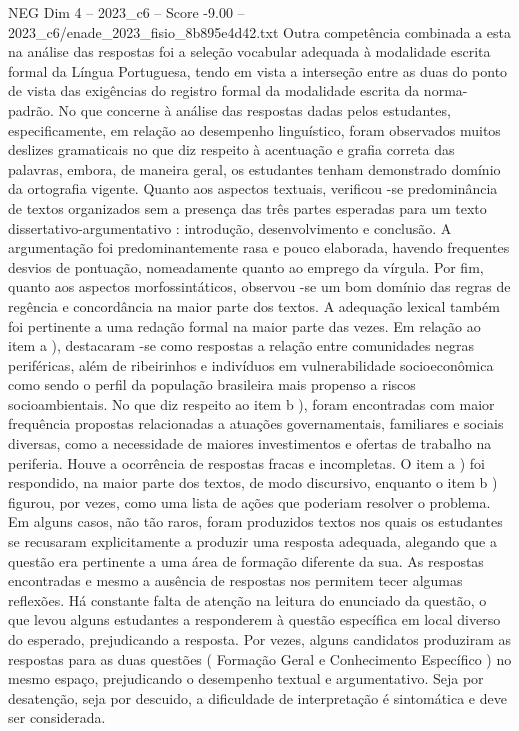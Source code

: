 \begin{textsample}{NEG Dim 4 – 2023\_c6 – Score -9.00 – 2023\_c6/enade\_2023\_fisio\_8b895e4d42.txt}
Outra competência combinada a esta na análise das respostas foi a seleção vocabular adequada à modalidade escrita formal da Língua Portuguesa, tendo em vista a interseção entre as duas do ponto de vista das exigências do registro formal da modalidade escrita da norma-padrão.
No que concerne à análise das respostas dadas pelos estudantes, especificamente, em relação ao desempenho linguístico, foram observados muitos deslizes gramaticais no que diz respeito à acentuação e grafia correta das palavras, embora, de maneira geral, os estudantes tenham demonstrado domínio da ortografia vigente.
Quanto aos aspectos textuais, verificou -se predominância de textos organizados sem a presença das três partes esperadas para um texto dissertativo-argumentativo : introdução, desenvolvimento e conclusão.
A argumentação foi predominantemente rasa e pouco elaborada, havendo frequentes desvios de pontuação, nomeadamente quanto ao emprego da vírgula.
Por fim, quanto aos aspectos morfossintáticos, observou -se um bom domínio das regras de regência e concordância na maior parte dos textos.
A adequação lexical também foi pertinente a uma redação formal na maior parte das vezes.
Em relação ao item a ), destacaram -se como respostas a relação entre comunidades negras periféricas, além de ribeirinhos e indivíduos em vulnerabilidade socioeconômica como sendo o perfil da população brasileira mais propenso a riscos socioambientais.
No que diz respeito ao item b ), foram encontradas com maior frequência propostas relacionadas a atuações governamentais, familiares e sociais diversas, como a necessidade de maiores investimentos e ofertas de trabalho na periferia.
Houve a ocorrência de respostas fracas e incompletas.
O item a ) foi respondido, na maior parte dos textos, de modo discursivo, enquanto o item b ) figurou, por vezes, como uma lista de ações que poderiam resolver o problema.
Em alguns casos, não tão raros, foram produzidos textos nos quais os estudantes se recusaram explicitamente a produzir uma resposta adequada, alegando que a questão era pertinente a uma área de formação diferente da sua.
As respostas encontradas e mesmo a ausência de respostas nos permitem tecer algumas reflexões.
Há constante falta de atenção na leitura do enunciado da questão, o que levou alguns estudantes a responderem à questão específica em local diverso do esperado, prejudicando a resposta.
Por vezes, alguns candidatos produziram as respostas para as duas questões ( Formação Geral e Conhecimento Específico ) no mesmo espaço, prejudicando o desempenho textual e argumentativo.
Seja por desatenção, seja por descuido, a dificuldade de interpretação é sintomática e deve ser considerada.

\end{textsample}
